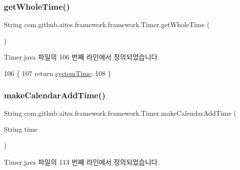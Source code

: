 \subsubsection{\texorpdfstring{get\+Whole\+Time()}{getWholeTime()}}
{\footnotesize\ttfamily String com.\+github.\+aites.\+framework.\+framework.\+Timer.\+get\+Whole\+Time (\begin{DoxyParamCaption}{ }\end{DoxyParamCaption})}



Timer.\+java 파일의 106 번째 라인에서 정의되었습니다.


\begin{DoxyCode}
106                                 \{
107         \textcolor{keywordflow}{return} \mbox{\hyperlink{classcom_1_1github_1_1aites_1_1framework_1_1framework_1_1_timer_a22ebaa7134740910d846b3bdbd416aef}{systemTime}};
108     \}
\end{DoxyCode}
\mbox{\label{classcom_1_1github_1_1aites_1_1framework_1_1framework_1_1_timer_a8139e285ba4eb7dba3459e836cf11146}} 
\subsubsection{\texorpdfstring{make\+Calendar\+Add\+Time()}{makeCalendarAddTime()}}
{\footnotesize\ttfamily String com.\+github.\+aites.\+framework.\+framework.\+Timer.\+make\+Calendar\+Add\+Time (\begin{DoxyParamCaption}\item[{String}]{time }\end{DoxyParamCaption})}



Timer.\+java 파일의 113 번째 라인에서 정의되었습니다.


